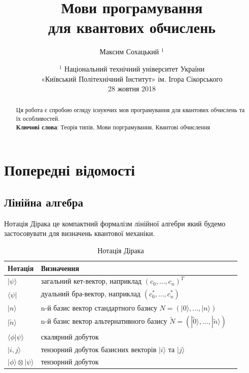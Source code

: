 \documentclass{article}
\theoremstyle{definition}
\begin{document}
\title{Мови програмування \\ для квантових обчислень}
\author{Максим Сохацький $^1$}
\date{ \small $^1$ Національний технічний університет України \\
       «Київський Політехнічний Інститут» ім. Ігора Сікорського \\
       28 жовтня 2018 }
\maketitle

\begin{abstract}
Ця робота є спробою огляду існуючих мов програмування
для квантових обчислень та їх особливостей.
\\
{\bf Ключові слова}: Теорія типів, Мови порграмування, Квантові обчислення
\end{abstract}
\tableofcontents

\newpage

\section{Попередні відомості}

\subsection{Лінійна алгебра}

Нотація Дірака це компактний формалізм лінійної алгебри який будемо застосовувати
для визначень квантової механіки.

\begin{table}[h]
\centering
  \caption{Нотація Дірака}
 \begin{tabular}{lll}
    \hline
       Нотація & Визначення \\
    \hline
       $|\psi\rangle$ & загальний кет-вектор, наприклад $(c_0,...,c_n)^T$ \\
       $\langle\psi|$ & дуальний бра-вектор, наприклад $(c_0^*,...,c_n^*)$ \\
       $|n\rangle$    & n-й базис вектор стандартного базису $N=(|0\rangle,...,|n\rangle)$\\
       $|\tilde{n}\rangle$    & n-й базис вектор альтернативного базису $\tilde{N}=(|\tilde{0}\rangle,...,|\tilde{n}\rangle)$ \\
       $\langle\phi|\psi\rangle$ & скалярний добуток \\
       $|i,j\rangle$ & тензорний добуток базисних векторів $|i\rangle$ та $|j\rangle$ \\
       $|\phi\rangle\otimes|\psi\rangle$ & тензорний добуток \\
    \hline
  \end{tabular}
\end{table}
\end{document}
